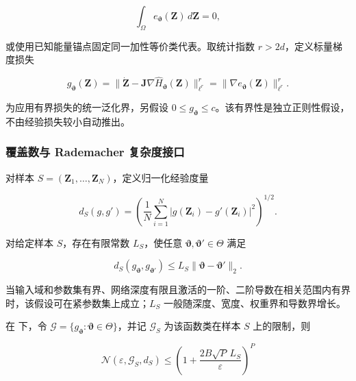 \begin{equation}
\label{eq:chnn-4-38}
\int_{\Omega}^{}e_{\bm{\vartheta}}\left( \mathbf{Z} \right)\, d\mathbf{Z} = 0,
\end{equation}

或使用已知能量锚点固定同一加性等价类代表。取统计指数 \(r > 2d\)，定义标量梯度损失

\begin{equation}
\label{eq:chnn-4-39}
g_{\bm{\vartheta}}\left( \mathbf{Z} \right) = \left. \parallel\dot{\mathbf{Z}} - \mathbf{J}\nabla{\widehat{H}}_{\bm{\vartheta}}\left( \mathbf{Z} \right) \right.\parallel_{\ell^{r}}^{r} = \left. \parallel\nabla e_{\bm{\vartheta}}\left( \mathbf{Z} \right) \right.\parallel_{\ell^{r}}^{r}.
\end{equation}

为应用有界损失的统一泛化界，另假设 \(0 \leq g_{\bm{\vartheta}} \leq c\)。该有界性是独立正则性假设，不由经验损失较小自动推出。

\subsubsection{覆盖数与 Rademacher 复杂度接口}\label{sec:chnn-4-6-3}

对样本 \(S = \left( \mathbf{Z}_{1},\ldots,\mathbf{Z}_{N} \right)\)，定义归一化经验度量

\begin{equation}
\label{eq:chnn-4-40}
d_{S}(g,g\prime) = \left( \frac{1}{N}\sum_{i = 1}^{N}\left| g\left( \mathbf{Z}_{i} \right) - g\prime\left( \mathbf{Z}_{i} \right) \right|^{2} \right)^{1/2}.
\end{equation}

\begin{assumption}\label{ass:parametric-loss-lipschitz}
对给定样本 \(S\)，存在有限常数 \(L_{S}\)，使任意 \(\bm{\vartheta},\bm{\vartheta}\prime \in \Theta\) 满足

\begin{equation}
\label{eq:chnn-4-41}
d_{S}\left( g_{\bm{\vartheta}},g_{\bm{\vartheta}\prime} \right) \leq L_{S}\left. \parallel\bm{\vartheta} - \bm{\vartheta}\prime \right.\parallel_{2}.
\end{equation}
\end{assumption}

当输入域和参数集有界、网络深度有限且激活的一阶、二阶导数在相关范围内有界时，该假设可在紧参数集上成立；\(L_{S}\) 一般随深度、宽度、权重界和导数界增长。

\begin{lemma}[有限参数覆盖数]\label{lem:finite-parameter-cover}
在 下，令 \(\mathcal{G} = \{ g_{\bm{\vartheta}}:\bm{\vartheta} \in \Theta\}\)，并记 \(\mathcal{G}_{S}\) 为该函数类在样本 \(S\) 上的限制，则

\begin{equation}
\label{eq:chnn-4-42}
\mathcal{N}\left( \varepsilon,\mathcal{G}_{S},d_{S} \right) \leq \left( 1 + \frac{2B\sqrt{P}\, L_{S}}{\varepsilon} \right)^{P}
\end{equation}
\end{lemma}

